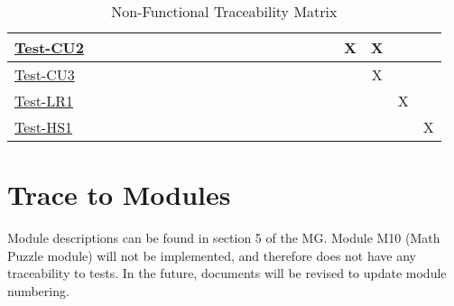 \documentclass[12pt, titlepage]{article}
\begin{document}
\begin{landscape}
\begin{table}[H]
\begin{adjustwidth}{-0.3in}{-0.5in}
{\begin{tabular}{c|c|c|c|c|c|c|c|c|c|c|c|c|c|c|c|c|c|c|c|c|c|}
\multicolumn{1}{|l|}{\hyperref[itm:Test-CU2]{Test-CU2}}   &             &             &             &             &             &              &             &             &              &              &              &             &              &             &             &         &&X&X&&     \\ \hline
\multicolumn{1}{|l|}{\hyperref[itm:Test-CU3]{Test-CU3}}   &             &             &             &             &             &              &             &             &              &              &              &             &              &             &             &         &&&X&&     \\ \hline
\multicolumn{1}{|l|}{\hyperref[itm:Test-LR1]{Test-LR1}}   &             &             &             &             &             &              &             &             &              &              &              &             &              &             &             &         &&&&X&     \\ \hline
\multicolumn{1}{|l|}{\hyperref[itm:Test-HS1]{Test-HS1}}   &             &             &             &             &             &              &             &             &              &              &              &             &              &             &             &         &&&&& X    \\ \hline


\end{tabular}

}
\caption{Non-Functional Traceability Matrix}
    \label{tab:matrix3}
\end{adjustwidth}
\end{table}
\end{landscape}

\section{Trace to Modules}		

Module descriptions can be found in section 5 of the MG. Module M10 (Math Puzzle module) will not be implemented, and therefore does not have any traceability to tests. In the future, documents will be revised to update module numbering.
\end{document}
